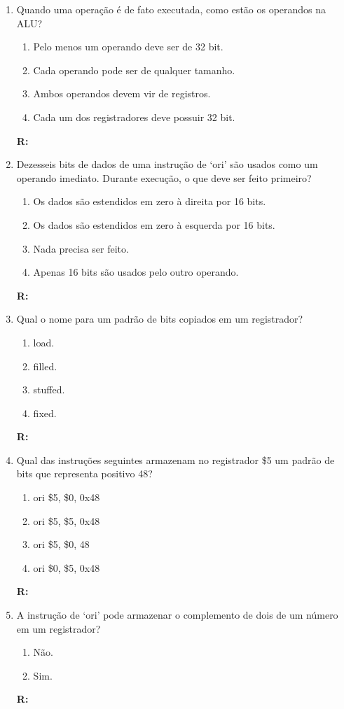 \documentclass[a4paper,11pt]{article}
\begin{document}
\begin{enumerate}
    \item{Quando uma operação é de fato executada, como estão os operandos na ALU?}
        \begin{enumerate}
            \item{Pelo menos um operando deve ser de 32 bit.}
            \item{Cada operando pode ser de qualquer tamanho.}
            \item{Ambos operandos devem vir de registros.}
            \item{Cada um dos registradores deve possuir 32 bit.}
        \end{enumerate}
        \textbf{R:}

    \item{Dezesseis bits de dados de uma instrução de `ori' são usados como um operando imediato. Durante
            execução, o que deve ser feito primeiro?}
        \begin{enumerate}
            \item{Os dados são estendidos em zero à direita por 16 bits.}
            \item{Os dados são estendidos em zero à esquerda por 16 bits.}
            \item{Nada precisa ser feito.}
            \item{Apenas 16 bits são usados pelo outro operando.}
        \end{enumerate}
        \textbf{R: }

    \item{Qual o nome para um padrão de bits copiados em um registrador?}
        \begin{enumerate}
            \item{load.}
            \item{filled.}
            \item{stuffed.}
            \item{fixed.}
        \end{enumerate}
        \textbf{R: }

    \item{Qual das instruções seguintes armazenam no registrador \$5 um padrão de bits que
            representa positivo 48?}
        \begin{enumerate}
            \item{ori \$5, \$0, 0x48}
            \item{ori \$5, \$5, 0x48}
            \item{ori \$5, \$0, 48}
            \item{ori \$0, \$5, 0x48}
        \end{enumerate}
        \textbf{R: }

    \item{A instrução de `ori' pode armazenar o complemento de dois de um número em um registrador?}
        \begin{enumerate}
            \item{Não.}
            \item{Sim.}
        \end{enumerate}
        \textbf{R:}

\end{enumerate}
\end{document}
